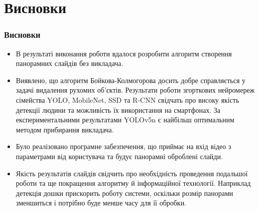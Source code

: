 \section{Висновки}
\begin{frame}
	\frametitle{Висновки}
	\begin{itemize}
		\item В результаті виконання роботи вдалося розробити алгоритм створення панорамних
			слайдів без викладача.

		\item Виявлено, що алгоритм Бойкова-Колмогорова досить добре справляється у
			задачі видалення рухомих об'єктів. Результати роботи згорткових нейромереж
			сімейства YOLO, MobileNet, SSD та R-CNN свідчать про високу якість детекції
			людини та можливість їх використання на смартфонах. За експериментальними
			результатами YOLOv5n є найбільш оптимальним методом прибирання викладача.

		\item Було реалізовано програмне забезпечення, що приймає на вхід відео з
			параметрами від користувача та будує панорамні оброблені слайди.

		\item Якість результатів слайдів свідчить про необхідність проведення подальшої
			роботи та ще покращення алгоритму й інформаційної технології. Наприклад
			детекція дошки прискорить роботу системи, оскільки розмір панорами зменшиться
			і потрібно буде менше часу для її обробки.
	\end{itemize}
\end{frame}